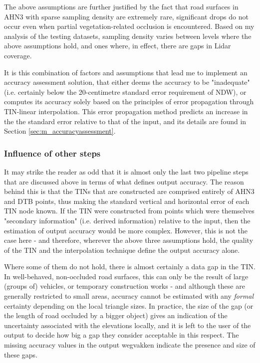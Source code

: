 The above assumptions are further justified by the fact that road surfaces in AHN3 with sparse sampling density are extremely rare, significant drops do not occur even when partial vegetation-related occlusion is encountered. Based on my analysis of the testing datasets, sampling density varies between levels where the above assumptions hold, and ones where, in effect, there are gaps in Lidar coverage.

It is this combination of factors and assumptions that lead me to implement an accuracy assessment solution, that either deems the accuracy to be "inadequate" (i.e. certainly below the 20-centimetre standard error requirement of NDW), or computes its accuracy solely based on the principles of error propagation through TIN-linear interpolation. This error propagation method predicts an increase in the the standard error relative to that of the input, and its details are found in Section \ref{sec:m_accuracyassessment}.

\subsubsection{Influence of other steps}

It may strike the reader as odd that it is almost only the last two pipeline steps that are discussed above in terms of what defines output accuracy. The reason behind this is that the TINs that are constructed are comprised entirely of AHN3 and DTB points, thus making the standard vertical and horizontal error of each TIN node known. If the TIN were constructed from points which were themselves "secondary information" (i.e. derived information) relative to the input, then the estimation of output accuracy would be more complex. However, this is not the case here - and therefore, wherever the above three assumptions hold, the quality of the TIN and the interpolation technique define the output accuracy alone.

Where some of them do not hold, there is almost certainly a data gap in the TIN. In well-behaved, non-occluded road surfaces, this can only be the result of large (groups of) vehicles, or temporary construction works - and although these are generally restricted to small areas, accuracy cannot be estimated with any \textit{formal} certainty depending on the local triangle sizes. In practice, the size of the gap (or the length of road occluded by a bigger object) gives an indication of the uncertainty associated with the elevations locally, and it is left to the user of the output to decide how big a gap they consider acceptable in this respect. The missing accuracy values in the output wegvakken indicate the presence and size of these gaps.

